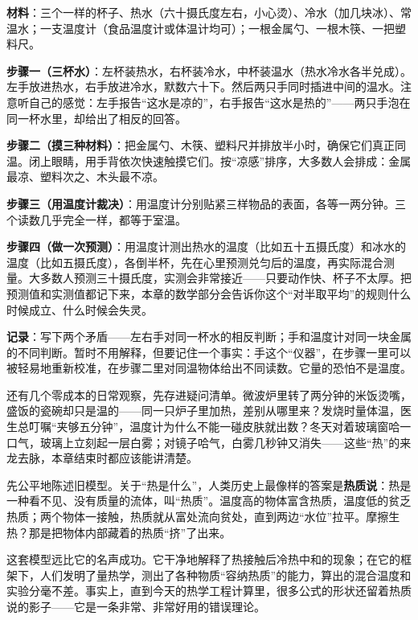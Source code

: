 
\begin{experiment}[三杯水和一个说谎的手]
\textbf{材料}：三个一样的杯子、热水（六十摄氏度左右，小心烫）、冷水（加几块冰）、常温水；一支温度计（食品温度计或体温计均可）；一根金属勺、一根木筷、一把塑料尺。

\textbf{步骤一（三杯水）}：左杯装热水，右杯装冷水，中杯装温水（热水冷水各半兑成）。左手放进热水，右手放进冷水，默数六十下。然后两只手同时插进中间的温水。注意听自己的感觉：左手报告“这水是凉的”，右手报告“这水是热的”——两只手泡在同一杯水里，却给出了相反的回答。

\textbf{步骤二（摸三种材料）}：把金属勺、木筷、塑料尺并排放半小时，确保它们真正同温。闭上眼睛，用手背依次快速触摸它们。按“凉感”排序，大多数人会排成：金属最凉、塑料次之、木头最不凉。

\textbf{步骤三（用温度计裁决）}：用温度计分别贴紧三样物品的表面，各等一两分钟。三个读数几乎完全一样，都等于室温。

\textbf{步骤四（做一次预测）}：用温度计测出热水的温度（比如五十五摄氏度）和冰水的温度（比如五摄氏度），各倒半杯，先在心里预测兑匀后的温度，再实际混合测量。大多数人预测三十摄氏度，实测会非常接近——只要动作快、杯子不太厚。把预测值和实测值都记下来，本章的数学部分会告诉你这个“对半取平均”的规则什么时候成立、什么时候会失灵。

\textbf{记录}：写下两个矛盾——左右手对同一杯水的相反判断；手和温度计对同一块金属的不同判断。暂时不用解释，但要记住一个事实：手这个“仪器”，在步骤一里可以被轻易地重新校准，在步骤二里对同温物体给出不同读数。它量的恐怕不是温度。
\end{experiment}

还有几个零成本的日常观察，先存进疑问清单。微波炉里转了两分钟的米饭烫嘴，盛饭的瓷碗却只是温的——同一只炉子里加热，差别从哪里来？发烧时量体温，医生总叮嘱“夹够五分钟”，温度计为什么不能一碰皮肤就出数？冬天对着玻璃窗哈一口气，玻璃上立刻起一层白雾；对镜子哈气，白雾几秒钟又消失——这些“热”的来龙去脉，本章结束时都应该能讲清楚。


先公平地陈述旧模型。关于“热是什么”，人类历史上最像样的答案是\textbf{热质说}：热是一种看不见、没有质量的流体，叫“热质”。温度高的物体富含热质，温度低的贫乏热质；两个物体一接触，热质就从富处流向贫处，直到两边“水位”拉平。摩擦生热？那是把物体内部藏着的热质“挤”了出来。

这套模型远比它的名声成功。它干净地解释了热接触后冷热中和的现象；在它的框架下，人们发明了量热学，测出了各种物质“容纳热质”的能力，算出的混合温度和实验分毫不差。事实上，直到今天的热学工程计算里，很多公式的形状还留着热质说的影子——它是一条非常、非常好用的错误理论。

